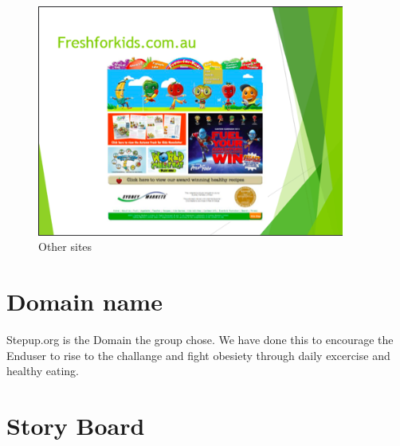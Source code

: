 \documentclass[letterpaper,12pt]{article}
\begin{document}
\begin{figure}[ht!]
  \centering
  \includegraphics[width=0.9\textwidth]{assets/jpg/othersite_3}
  \caption{Other sites}
  \label{fig:othersites}
\end{figure}
\FloatBarrier

\section{Domain name}

Stepup.org is the Domain the group chose. We have done this to encourage the Enduser to rise to the challange and fight obesiety through daily excercise and healthy eating.

\section{Story Board}
\end{document}
